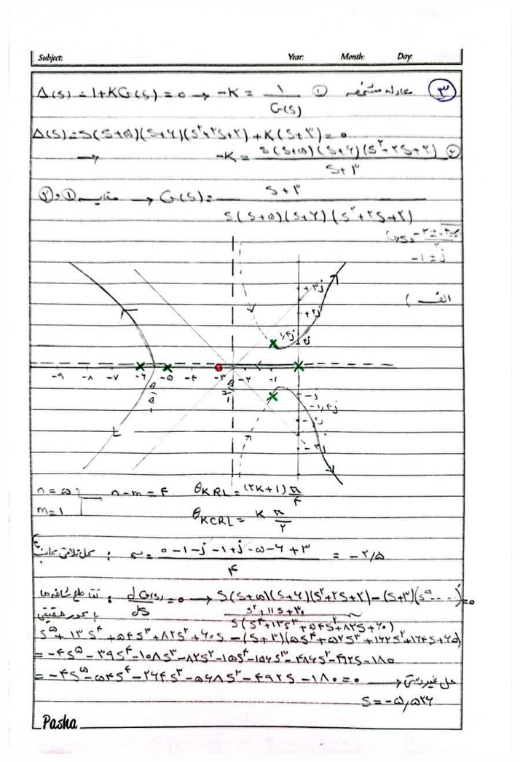\documentclass[a4,12pt]{article}
\begin{document}
			\includegraphics[width=15cm]{q3.jpg}
\end{document}
